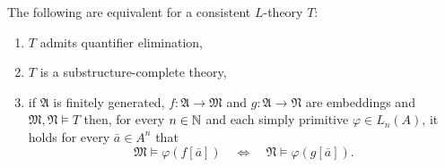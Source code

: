\begin{lem}\label{lem:qelim}
	The following are equivalent for a consistent $L$-theory $T$:
	\begin{enumerate}
		\item	$T$ admits quantifier elimination,
		\item	$T$ is a substructure-complete theory,
		\item	if $\mathfrak{A}$ is finitely generated, $f\colon\mathfrak{A}\to\mathfrak{M}$ and $g\colon\mathfrak{A}\to\mathfrak{N}$ are embeddings and $\mathfrak{M},\mathfrak{N}\models T$ then, for every $n\in\mathbb{N}$ and each simply primitive $\varphi\in L_n(A)$, it holds for every $\bar{a}\in A^n$ that
		      \begin{equation}
			      \mathfrak{M}\models\varphi(f[\bar{a}]) \quad\iff\quad \mathfrak{N}\models\varphi(g[\bar{a}]).\label{eq:qelim}
		      \end{equation}
	\end{enumerate}
\end{lem}
